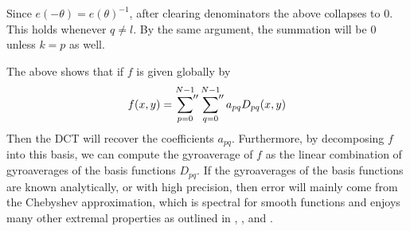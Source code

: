 Since $e(-\theta) = e(\theta)^{-1}$, after clearing denominators the above collapses to 0.  This holds whenever $q \neq l$.  By the same argument, the summation will be $0$ unless $k=p$ as well.   

The above shows that if $f$ is given globally by 
\[ f(x,y)= \sideset{}{''}\sum_{p=0}^{N-1} \sideset{}{''}\sum_{q=0}^{N-1} a_{pq}  D_{pq}(x,y)\]
Then the DCT will recover the coefficients $a_{pq}$.  Furthermore, by decomposing $f$ into this basis, we can compute the gyroaverage of $f$ as the linear combination of gyroaverages of the basis functions $D_{pq}$.  If the gyroaverages of the basis functions are known analytically, or with high precision, then error will mainly come from the Chebyshev approximation, which is spectral for smooth functions and enjoys many other extremal properties as outlined in \cite{trefethenATAP}, \cite{masonCheb}, and \cite{rivlinCheb}.
